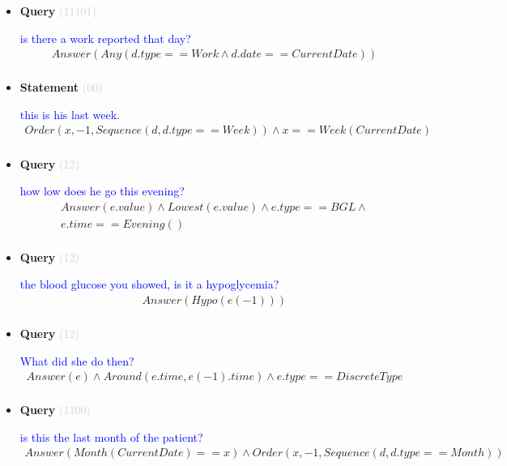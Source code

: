 \documentclass[11pt]{article}
\newcommand{\key}[1]{\textcolor{lightgray}{#1}}
\newcounter{CQuery}
\newcounter{CStatement}
\begin{document}
\begin{itemize}
\item
\textbf{Query\theCQuery} \key{(11101)} \addtocounter{CQuery}{1}
\textcolor{blue}{ is there a work reported that day? }
\begin{multline*}
Answer(Any(d.type==Work \wedge d.date==CurrentDate)) \\ 
\end{multline*}


\item
\textbf{Statement\theCStatement} \key{(00)} \addtocounter{CStatement}{1}
\textcolor{blue}{ this is his last week. }
\begin{multline*}
Order(x, -1, Sequence(d, d.type==Week)) \wedge x==Week(CurrentDate) \\ 
\end{multline*}


\item
\textbf{Query\theCQuery} \key{(12)} \addtocounter{CQuery}{1}
\textcolor{blue}{ how low does he go this evening? }
\begin{multline*}
Answer(e.value) \wedge Lowest(e.value) \wedge e.type==BGL \wedge \\ 
e.time==Evening() \\ 
\end{multline*}


\item
\textbf{Query\theCQuery} \key{(12)} \addtocounter{CQuery}{1}
\textcolor{blue}{ the blood glucose you showed, is it a hypoglycemia? }
\begin{multline*}
Answer(Hypo(e(-1))) \\ 
\end{multline*}


\item
\textbf{Query\theCQuery} \key{(12)} \addtocounter{CQuery}{1}
\textcolor{blue}{ What did she do then? }
\begin{multline*}
Answer(e) \wedge Around(e.time, e(-1).time) \wedge e.type==DiscreteType \\ 
\end{multline*}


\item
\textbf{Query\theCQuery} \key{(1100)} \addtocounter{CQuery}{1}
\textcolor{blue}{ is this the last month of the patient? }
\begin{multline*}
Answer(Month(CurrentDate)==x) \wedge Order(x, -1, Sequence(d, d.type==Month)) \\ 
\end{multline*}



\end{itemize}
\end{document}
